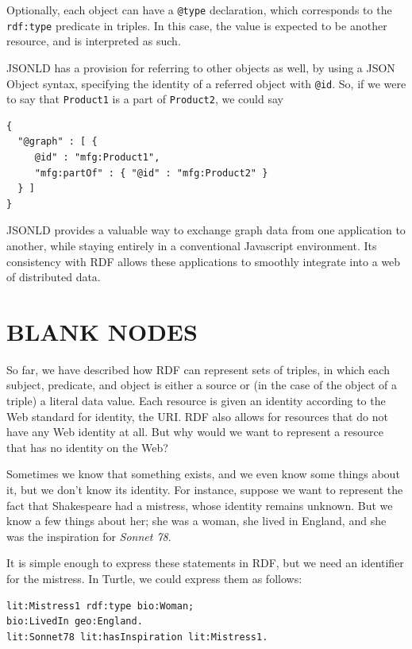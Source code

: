 Optionally, each object can have a \texttt{@type} declaration, which corresponds
to the \texttt{rdf:type} predicate in triples. In this case, the value is
expected to be another resource, and is interpreted as such.

JSONLD has a provision for referring to other objects as well, by using
a JSON Object syntax, specifying the identity of a referred object with
\texttt{@id}. So, if we were to say that \texttt{Product1} is a part of \texttt{Product2}, we could
say

\begin{lstlisting}
{
  "@graph" : [ {
     @id" : "mfg:Product1",
     "mfg:partOf" : { "@id" : "mfg:Product2" }
  } ]
}    
\end{lstlisting}

JSONLD provides a valuable way to exchange graph data from one
application to another, while staying entirely in a conventional
Javascript environment. Its consistency with RDF allows these
applications to smoothly integrate into a web of distributed data.

\section{BLANK NODES}

So far, we have described how RDF can represent sets of triples, in
which each subject, predicate, and object is either a source or (in the
case of the object of a triple) a literal data value. Each resource is
given an identity according to the Web standard for identity, the URI.
RDF also allows for resources that do not have any Web identity at all.
But why would we want to represent a resource that has no identity on
the Web?

Sometimes we know that something exists, and we even know some things
about it, but we don't know its identity. For instance, suppose we want
to represent the fact that Shakespeare had a mistress, whose identity
remains unknown. But we know a few things about her; she was a woman,
she lived in England, and she was the inspiration for \emph{Sonnet 78}.

It is simple enough to express these statements in RDF, but we need an
identifier for the mistress. In
Turtle, we could express them as follows:

\begin{lstlisting}
lit:Mistress1 rdf:type bio:Woman;
bio:LivedIn geo:England.
lit:Sonnet78 lit:hasInspiration lit:Mistress1.
\end{lstlisting}

